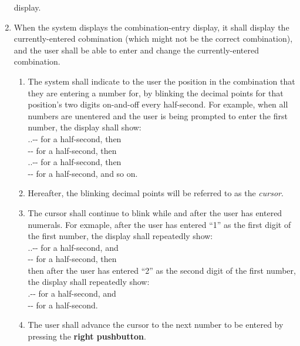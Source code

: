 \begin{enumerate}
    display.
\item \label{spec:enterCombination} When the system displays the
    combination-entry display, it shall display the currently-entered
    cobmination (which might not be the correct combination), and the user shall
    be able to enter and change the currently-entered combination.
    \begin{enumerate}
    \item The system shall indicate to the user the position in the combination
        that they are entering a number for, by blinking the decimal points for
        that position's two digits on-and-off every half-second. For example,
        when all numbers are unentered and the user is being prompted to enter
        the first number, the display shall show: \\
        {\dviiseg \phantom{8}.\phantom{8}.-\phantom{88}-\phantom{88}} for a
            half-second, then \\
        {\dviiseg \phantom{88}-\phantom{88}-\phantom{88}} for a half-second,
            then \\
        {\dviiseg \phantom{8}.\phantom{8}.-\phantom{88}-\phantom{88}} for a
            half-second, then \\
        {\dviiseg \phantom{88}-\phantom{88}-\phantom{88}} for a half-second, and
            so on.
    \item Hereafter, the blinking decimal points will be referred to as the
        \textit{cursor}.
    \item The cursor shall continue to blink while and after the user has
        entered numerals. For exmaple, after the user has entered ``1'' as the
        first digit of the first number, the display shall repeatedly show: \\
        {.\phantom{8}.-\phantom{88}-\phantom{88}} for a
            half-second, and \\
        {\phantom{8}-\phantom{88}-\phantom{88}} for a half-second,
            then \\
        then after the user has entered ``2'' as the second digit of the first
        number, the display shall repeatedly show: \\
        {.-\phantom{88}-\phantom{88}} for a
            half-second, and \\
        {-\phantom{88}-\phantom{88}} for a half-second.
    \item The user shall advance the cursor to the next number to be entered by
        pressing the \textbf{right pushbutton}.

\end{enumerate}
\end{enumerate}
